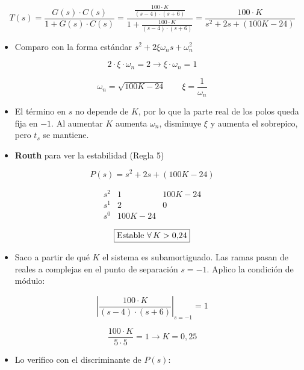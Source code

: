\documentclass[10pt]{article}
\begin{document}
\[
T(s) = \frac{G(s) \cdot C(s)}{1 + G(s) \cdot C(s)} = \frac{\frac{100 \cdot K}{(s - 4) \cdot (s + 6)}}{1 + \frac{100 \cdot K}{(s - 4) \cdot (s + 6)}} = \frac{100 \cdot K}{s^2 + 2s + (100K - 24)}
\]

\begin{itemize}
    \item Comparo con la forma estándar $s^2 + 2 \xi \omega_n s + \omega_n^2$
\end{itemize}

\[
2 \cdot \xi \cdot \omega_n = 2 \longrightarrow \xi \cdot \omega_n = 1
\]

\[
\omega_n = \sqrt{100K - 24} \qquad \xi = \frac{1}{\omega_n}
\]

\begin{itemize}
    \item El término en $s$ no depende de $K$, por lo que la parte real de los polos queda fija en $-1$. Al aumentar $K$ aumenta $\omega_n$, disminuye $\xi$ y aumenta el sobrepico, pero $t_s$ se mantiene.
\end{itemize}

\begin{itemize}
    \item \textbf{Routh} para ver la estabilidad (Regla 5)
\end{itemize}

\[
P(s) = s^2 + 2s + (100K - 24)
\]

\[
\begin{array}{c|cc}
s^2 & 1 & 100K - 24 \\
s^1 & 2 & 0 \\
s^0 & 100K - 24 &
\end{array}
\]

\[
\fbox{Estable $\forall \, K > 0{,}24$}
\]

\begin{itemize}
    \item Saco a partir de qué $K$ el sistema es subamortiguado. Las ramas pasan de reales a complejas en el punto de separación $s = -1$. Aplico la condición de módulo:
\end{itemize}

\[
\left| \frac{100 \cdot K}{(s - 4) \cdot (s + 6)} \right|_{s = -1} = 1
\]

\[
\frac{100 \cdot K}{5 \cdot 5} = 1 \longrightarrow K = 0{,}25
\]

\begin{itemize}
    \item Lo verifico con el discriminante de $P(s)$:
\end{itemize}
\end{document}
